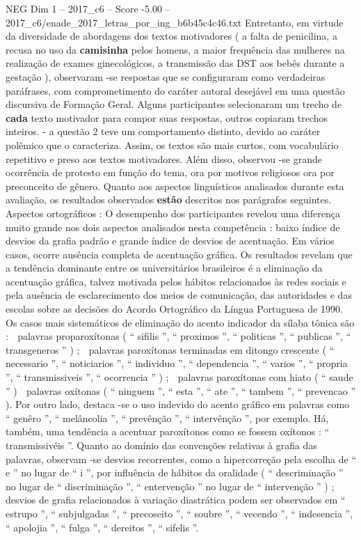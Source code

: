 \begin{textsample}{NEG Dim 1 – 2017\_c6 – Score -5.00 – 2017\_c6/enade\_2017\_letras\_por\_ing\_b6b45c4c46.txt}
Entretanto, em virtude da diversidade de abordagens dos textos motivadores ( a falta de penicilina, a recusa no uso da \textbf{camisinha} pelos homens, a maior frequência das mulheres na realização de exames ginecológicos, a transmissão das DST aos bebês durante a gestação ), observaram -se respostas que se configuraram como verdadeiras paráfrases, com comprometimento do caráter autoral desejável em uma questão discursiva de Formação Geral.
Alguns participantes selecionaram um trecho de \textbf{cada} texto motivador para compor suas respostas, outros copiaram trechos inteiros. - a questão 2 teve um comportamento distinto, devido ao caráter polêmico que o caracteriza.
Assim, os textos são mais curtos, com vocabulário repetitivo e preso aos textos motivadores.
Além disso, observou -se grande ocorrência de protesto em função do tema, ora por motivos religiosos ora por preconceito de gênero.
Quanto aos aspectos linguísticos analisados durante esta avaliação, os resultados observados \textbf{estão} descritos nos parágrafos seguintes.
Aspectos ortográficos : O desempenho dos participantes revelou uma diferença muito grande nos dois aspectos analisados nesta competência : baixo índice de desvios da grafia padrão e grande índice de desvios de acentuação.
Em vários casos, ocorre ausência completa de acentuação gráfica.
Os resultados revelam que a tendência dominante entre os universitários brasileiros é a eliminação da acentuação gráfica, talvez motivada pelos hábitos relacionados às redes sociais e pela ausência de esclarecimento dos meios de comunicação, das autoridades e das escolas sobre as decisões do Acordo Ortográfico da Língua Portuguesa de 1990.
Os casos mais sistemáticos de eliminação do acento indicador da sílaba tônica são :  palavras proparoxítonas ( “ sifilis ”, “ proximos ”, “ politicas ”, “ publicas ”, “ transgeneros ” ) ;  palavras paroxítonas terminadas em ditongo crescente ( “ necessario ”, “ noticiarios ”, “ individuo ”, “ dependencia ”, “ varios ”, “ propria ”, “ transmissiveis ”, “ ocorrencia ” ) ;  palavras paroxítonas com hiato ( “ saude ” )  palavras oxítonas ( “ ninguem ”, “ esta ”, “ ate ”, “ tambem ”, “ prevencao ” ).
Por outro lado, destaca -se o uso indevido do acento gráfico em palavras como “ genêro ”, “ melâncolia ”, “ prevênção ”, “ intervênção ”, por exemplo.
Há, também, uma tendência a acentuar paroxítonos como se fossem oxítonos : “ transmissivéis ”.
Quanto ao domínio das convenções relativas à grafia das palavras, observam -se desvios recorrentes, como a hipercorreção pela escolha de “ e ” no lugar de “ i ”, por influência de hábitos da oralidade ( “ descriminação ” no lugar de “ discriminação ”, “ entervenção ” no lugar de “ intervenção ” ) ; desvios de grafia relacionados à variação diastrática podem ser observados em “ estrupo ”, “ subjulgadas ”, “ precoseito ”, “ soubre ”, “ vecendo ”, “ indesencia ”, “ apolojia ”, “ fulga ”, “ dereitos ”, “ sifelis ”.

\end{textsample}
